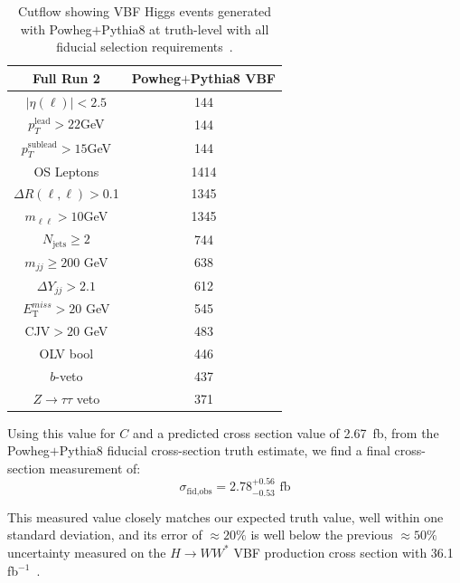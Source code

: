 \begin{table}[!ht]
\centering
\begin{tabular}{c||c}
\textbf{Full Run 2} & \textbf{Powheg$+$Pythia8 VBF} \\
\hline
$|\eta(\ell)|<2.5$ & 144 \\
$p_T^{\text{lead}}>22$GeV &144 \\
$p_T^{\text{sublead}}>15$GeV & 144\\
OS Leptons & 1414 \\
$\Delta R(\ell,\ell) >$0.1 & 1345 \\
$m_{\ell\ell}>10$GeV & 1345  \\
$N_{\text{jets}}\geq2$ & 744\\
$m_{jj} \geq 200$ GeV & 638  \\
$\Delta Y_{jj}>2.1$ & 612  \\
$E_{\text{T}}^{miss}>20$ GeV & 545  \\
CJV$>20$ GeV & 483 \\
OLV bool & 446  \\
$b$-veto & 437  \\
$Z\rightarrow\tau\tau$ veto & 371 \\
\hline
\end{tabular}
\caption{Cutflow showing VBF Higgs events generated with Powheg$+$Pythia8 at truth-level with all fiducial selection requirements~\cite{ourSupportNote}. }
\label{tab:truth}
\end{table}

Using this value for $C$ and a predicted cross section value of 2.67~fb, from the Powheg$+$Pythia8 fiducial cross-section truth estimate, we find a final cross-section measurement of:
\begin{equation}
\sigma_{\text{fid,obs}} = 2.78^{+0.56}_{-0.53} \text{ fb} 
\end{equation}

This measured value closely matches our expected truth value, well within one standard deviation, and its error of $\approx20\%$ is well below the previous $\approx50\%$ uncertainty measured on the $H\rightarrow WW^*$ VBF production cross section with 36.1 fb$^{-1}$~\cite{Aaboud_2019}. 

